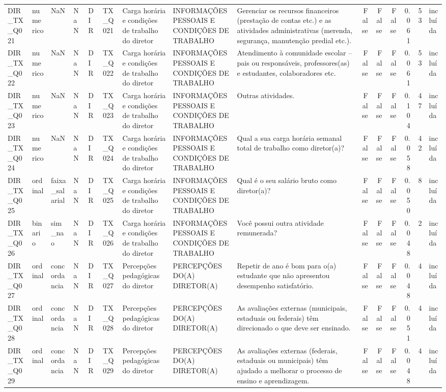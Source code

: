 \begin{tabular}{lllllllllrrrrrl}
DIR\_TX\_Q021 & numerico & NaN & NaN & DIR & TX\_Q021 & Carga horária e condições de trabalho do diretor & INFORMAÇÕES PESSOAIS E CONDIÇÕES DE TRABALHO & Gerenciar os recursos financeiros (prestação de contas etc.) e as atividades administrativas (merenda, segurança, manutenção predial etc.). & False & False & False & 0.061 & 53 & incluída \\
DIR\_TX\_Q022 & numerico & NaN & NaN & DIR & TX\_Q022 & Carga horária e condições de trabalho do diretor & INFORMAÇÕES PESSOAIS E CONDIÇÕES DE TRABALHO & Atendimento à comunidade escolar – pais ou responsáveis, professores(as) e estudantes, colaboradores etc. & False & False & False & 0.061 & 53 & incluída \\
DIR\_TX\_Q023 & numerico & NaN & NaN & DIR & TX\_Q023 & Carga horária e condições de trabalho do diretor & INFORMAÇÕES PESSOAIS E CONDIÇÕES DE TRABALHO & Outras atividades. & False & False & False & 0.104 & 47 & incluída \\
DIR\_TX\_Q024 & numerico & NaN & NaN & DIR & TX\_Q024 & Carga horária e condições de trabalho do diretor & INFORMAÇÕES PESSOAIS E CONDIÇÕES DE TRABALHO & Qual a sua carga horária semanal total de trabalho como diretor(a)? & False & False & False & 0.058 & 42 & incluída \\
DIR\_TX\_Q025 & ordinal & faixa\_salarial & NaN & DIR & TX\_Q025 & Carga horária e condições de trabalho do diretor & INFORMAÇÕES PESSOAIS E CONDIÇÕES DE TRABALHO & Qual é o seu salário bruto como diretor(a)? & False & False & False & 0.050 & 8 & incluída \\
DIR\_TX\_Q026 & binario & sim\_nao & NaN & DIR & TX\_Q026 & Carga horária e condições de trabalho do diretor & INFORMAÇÕES PESSOAIS E CONDIÇÕES DE TRABALHO & Você possui outra atividade remunerada? & False & False & False & 0.048 & 2 & incluída \\
DIR\_TX\_Q027 & ordinal & concordancia & NaN & DIR & TX\_Q027 & Percepções pedagógicas do diretor & PERCEPÇÕES DO(A) DIRETOR(A) & Repetir de ano é bom para o(a) estudante que não apresentou desempenho satisfatório. & False & False & False & 0.048 & 4 & incluída \\
DIR\_TX\_Q028 & ordinal & concordancia & NaN & DIR & TX\_Q028 & Percepções pedagógicas do diretor & PERCEPÇÕES DO(A) DIRETOR(A) & As avaliações externas (municipais, estaduais ou federais) têm direcionado o que deve ser ensinado. & False & False & False & 0.051 & 4 & incluída \\
DIR\_TX\_Q029 & ordinal & concordancia & NaN & DIR & TX\_Q029 & Percepções pedagógicas do diretor & PERCEPÇÕES DO(A) DIRETOR(A) & As avaliações externas (federais, estaduais ou municipais) têm ajudado a melhorar o processo de ensino e aprendizagem. & False & False & False & 0.048 & 4 & incluída \\

\end{tabular}
